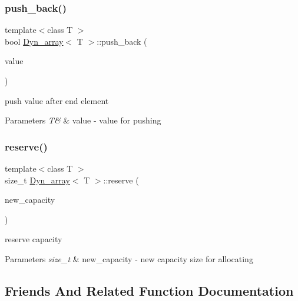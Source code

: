 \subsubsection{\texorpdfstring{push\+\_\+back()}{push\_back()}}
{\footnotesize\ttfamily template$<$class T $>$ \\
bool \hyperlink{classDyn__array}{Dyn\+\_\+array}$<$ T $>$\+::push\+\_\+back (\begin{DoxyParamCaption}\item[{const T \&}]{value }\end{DoxyParamCaption})}



push value after end element 


\begin{DoxyParams}{Parameters}
{\em T\&} & value -\/ value for pushing \\
\hline
\end{DoxyParams}
\mbox{\label{classDyn__array_a8cc1e876bc20ce13490898be4bdd7882}} 
\subsubsection{\texorpdfstring{reserve()}{reserve()}}
{\footnotesize\ttfamily template$<$class T $>$ \\
size\+\_\+t \hyperlink{classDyn__array}{Dyn\+\_\+array}$<$ T $>$\+::reserve (\begin{DoxyParamCaption}\item[{const size\+\_\+t}]{new\+\_\+capacity }\end{DoxyParamCaption})}



reserve capacity 


\begin{DoxyParams}{Parameters}
{\em size\+\_\+t} & new\+\_\+capacity -\/ new capacity size for allocating \\
\hline
\end{DoxyParams}


\subsection{Friends And Related Function Documentation}
\mbox{\label{classDyn__array_aebc2873551e997f690220158398e5bf3}} 
